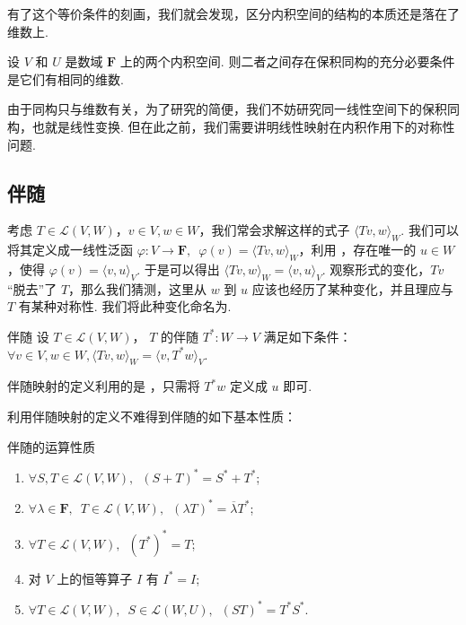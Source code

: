有了这个等价条件的刻画，我们就会发现，区分内积空间的结构的本质还是落在了维数上.

\begin{theorem}{}{}
    设 $ V $ 和 $ U $ 是数域 $ \mathbf{F} $ 上的两个内积空间. 则二者之间存在保积同构的充分必要条件是它们有相同的维数.
\end{theorem}

由于同构只与维数有关，为了研究的简便，我们不妨研究同一线性空间下的保积同构，也就是线性变换. 但在此之前，我们需要讲明线性映射在内积作用下的对称性问题.

\subsection{伴随}

考虑 $ T \in \mathcal{L}(V, W) $，$ v \in V, w \in W $，我们常会求解这样的式子 $ \langle Tv, w \rangle_W $. 我们可以将其定义成一线性泛函 $ \varphi : V \rightarrow \mathbf{F}, \enspace \varphi (v) = \langle Tv, w \rangle_W $，利用 ，存在唯一的 $ u \in W $，使得 $ \varphi (v) = \langle v, u \rangle_V $. 于是可以得出 $ \langle Tv, w \rangle_W = \langle v, u \rangle_V $. 观察形式的变化，$ Tv $ ``脱去''了 $ T $，那么我们猜测，这里从 $ w $ 到 $ u $ 应该也经历了某种变化，并且理应与 $ T $ 有某种对称性. 我们将此种变化命名为.

\begin{definition}{伴随}{} 
    设 $ T \in \mathcal{L}(V, W) $， $ T $ 的伴随 $ T^*: W \rightarrow V $ 满足如下条件： $ \forall v \in V, w \in W, \langle Tv, w \rangle_W = \langle v, T^*w \rangle_V $.
\end{definition}

伴随映射的定义利用的是 ，只需将 $ T^*w $ 定义成 $ u $ 即可.

利用伴随映射的定义不难得到伴随的如下基本性质：

\begin{example}{伴随的运算性质}{}
\begin{enumerate}
    \item $ \forall S, T \in \mathcal{L}(V, W),\enspace (S + T)^* = S^* + T^* $;

    \item $ \forall \lambda \in \mathbf{F},\enspace T \in \mathcal{L}(V, W),\enspace (\lambda T)^* = \overline{\lambda} T^* $;

    \item $ \forall T \in \mathcal{L}(V, W),\enspace (T^*)^* = T $;

    \item 对 $ V $ 上的恒等算子 $ I $ 有 $ I^* = I $;

    \item $ \forall T \in \mathcal{L}(V, W),\enspace S \in \mathcal{L}(W, U),\enspace (ST)^* = T^*S^* $.
\end{enumerate}
\end{example}

